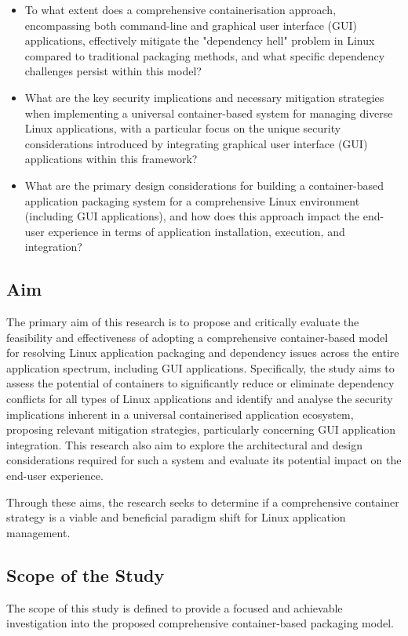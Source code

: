 \documentclass[journal,onecolumn]{IEEEtran}
\begin{document}
\begin{itemize}[]
    \item[\textbf{RQ1:}] To what extent does a comprehensive containerisation approach, encompassing both command-line and graphical user interface (GUI) applications, effectively mitigate the "dependency hell" problem in Linux compared to traditional packaging methods, and what specific dependency challenges persist within this model?
    \item[\textbf{RQ2:}] What are the key security implications and necessary mitigation strategies when implementing a universal container-based system for managing diverse Linux applications, with a particular focus on the unique security considerations introduced by integrating graphical user interface (GUI) applications within this framework?
    \item[\textbf{RQ3:}] What are the primary design considerations for building a container-based application packaging system for a comprehensive Linux environment (including GUI applications), and how does this approach impact the end-user experience in terms of application installation, execution, and integration? 
\end{itemize}


\subsection{Aim}
The primary aim of this research is to propose and critically evaluate the feasibility and effectiveness of adopting a comprehensive container-based model for resolving Linux application packaging and dependency issues across the entire application spectrum, including GUI applications. Specifically, the study aims to assess the potential of containers to significantly reduce or eliminate dependency conflicts for all types of Linux applications and identify and analyse the security implications inherent in a universal containerised application ecosystem, proposing relevant mitigation strategies, particularly concerning GUI application integration. This research also aim to explore the architectural and design considerations required for such a system and evaluate its potential impact on the end-user experience. 

Through these aims, the research seeks to determine if a comprehensive container strategy is a viable and beneficial paradigm shift for Linux application management. 

\subsection{Scope of the Study}
The scope of this study is defined to provide a focused and achievable investigation into the proposed comprehensive container-based packaging model. 
\end{document}
